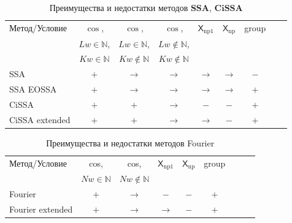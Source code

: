 \documentclass[a4paper, 11pt]{article}
\newcommand{\SSA}{\textbf{SSA}}
\newcommand{\CISSA}{\textbf{CiSSA}}
\newcommand{\TS}{\mathsf{X}}
\begin{document}
\begin{table}[H]
	\caption{Преимущества и недостатки методов $\SSA$, $\CISSA$}
	\centering
	\begin{center}
		\begin{tabular}{l|cccccccc}
			\hline
			Метод/Условие  & $\cos$,             & $\cos$,                & $\cos$,                 & $\TS_{\mathrm{np1}}$ & $\TS_{\mathrm{np}}$ & group \\
			               & $Lw \in \mathbb N$, & $Lw\in \mathbb N$,     & $Lw \not\in \mathbb N$, &                                                    \\
			               & $Kw\in \mathbb N$   & $Kw \not\in \mathbb N$ & $Kw \not\in \mathbb N$  &                                                    \\
			\hline
			SSA            & $+$                 & $\to$                  & $\to$                   & $\to$                & $\to$               & $-$   \\
			SSA EOSSA      & $+$                 & $\to$                  & $\to$                   & $\to$                & $\to$               & $+$   \\
			CiSSA          & $+$                 & $+$                    & $\to$                   & $-$                  & $-$                 & $+$   \\
			CiSSA extended & $+$                 & $+$                    & $\to$                   & $\to$                & $-$                 & $+$   \\
			\hline
		\end{tabular}
	\end{center}
	\label{tab:advantages_ssa_cissa}
\end{table}

\begin{table}[H]
	\caption{Преимущества и недостатки методов Fourier}
	\centering
	\begin{center}
		\begin{tabular}{l|cccccccc}
			\hline
			Метод/Условие    & cos,               & cos,                    & $\TS_{\mathrm{np1}}$ & $\TS_{\mathrm{np}}$ & group \\
			                 & $Nw \in \mathbb N$ & $Nw \not \in \mathbb N$                                                      \\
			\hline
			Fourier          & $+$                & $\to$                   & $-$                  & $-$                 & $+$   \\
			Fourier extended & $+$                & $\to$                   & $\to$                & $-$                 & $+$   \\
			\hline
		\end{tabular}
	\end{center}
	\label{tab:advantages_fourier}
\end{table}
\end{document}
